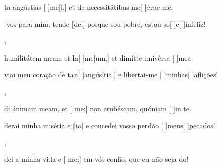 {  {\item {}ta angústias [ ]{me}[i,] et de necessitátibus me[ ]{é}{ru}{e} me.}%
    {\item {}-vos para mim, tende [de,] porque sou pobre, estou so[ ]{e}[ ]{in}feliz!},
  {\item {} humilitátem meam et la[ ]{me}[um,] et dimítte univérsa [ ]{me}a.}%
    {\item {}viai meu coração de tan[ ]{an}{gús}[tia,] e libertai-me [ ]{mi}{nhas}[ ]{a}flições!},
  {\item {}di ánimam meam, et [ me;] non erubéscam, quóniam [ ]{in} te.}%
    {\item {}derai minha miséria e [to] e concedei vosso perdão [ ]{meus}[ ]{pe}{ca}dos!},
  {}%
    {\item {}dei a minha vida e [-me;] em vós confio, que eu não seja do!}
}
